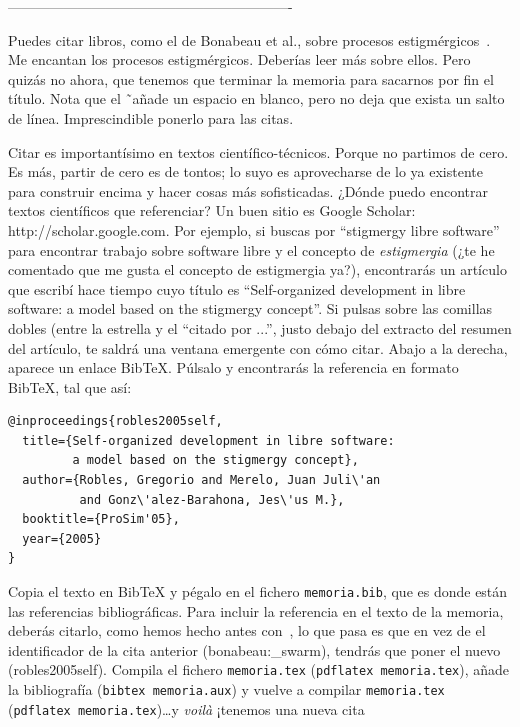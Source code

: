 \documentclass[a4paper, 12pt]{book}
\begin{document}
-------------------------------------------------------------

Puedes citar libros, como el de Bonabeau et al., sobre procesos estigmérgicos~\cite{Cisco:_video}.
Me encantan los procesos estigmérgicos.
Deberías leer más sobre ellos.
Pero quizás no ahora, que tenemos que terminar la memoria para sacarnos por fin el título.
Nota que el \~ \ añade un espacio en blanco, pero no deja que exista un salto de línea.
Imprescindible ponerlo para las citas.

Citar es importantísimo en textos científico-técnicos.
Porque no partimos de cero.
Es más, partir de cero es de tontos; lo suyo es aprovecharse de lo ya existente para construir encima y hacer cosas más sofisticadas.
¿Dónde puedo encontrar textos científicos que referenciar?
Un buen sitio es Google Scholar: {http://scholar.google.com}.
Por ejemplo, si buscas por ``stigmergy libre software'' para encontrar trabajo sobre software libre y el concepto de \emph{estigmergia} (¿te he comentado que me gusta el concepto de estigmergia ya?), encontrarás un artículo que escribí hace tiempo cuyo título es ``Self-organized development in libre software: a model based on the stigmergy concept''.
Si pulsas sobre las comillas dobles (entre la estrella y el ``citado por ...'', justo debajo del extracto del resumen del artículo, te saldrá una ventana emergente con cómo citar.
Abajo a la derecha, aparece un enlace BibTeX.
Púlsalo y encontrarás la referencia en formato BibTeX, tal que así:

{\footnotesize
\begin{verbatim}
@inproceedings{robles2005self,
  title={Self-organized development in libre software:
         a model based on the stigmergy concept},
  author={Robles, Gregorio and Merelo, Juan Juli\'an
          and Gonz\'alez-Barahona, Jes\'us M.},
  booktitle={ProSim'05},
  year={2005}
}
\end{verbatim}
}

Copia el texto en BibTeX y pégalo en el fichero \texttt{memoria.bib}, que es donde están las referencias bibliográficas.
Para incluir la referencia en el texto de la memoria, deberás citarlo, como hemos hecho antes con~\cite{bonabeau:_swarm}, lo que pasa es que en vez de el identificador de la cita anterior (bonabeau:\_swarm), tendrás que poner el nuevo (robles2005self).
Compila el fichero \texttt{memoria.tex} (\texttt{pdflatex memoria.tex}), añade la bibliografía (\texttt{bibtex memoria.aux}) y vuelve a compilar \texttt{memoria.tex} (\texttt{pdflatex memoria.tex})\ldots y \emph{voilà} ¡tenemos una nueva cita~%
\end{document}
